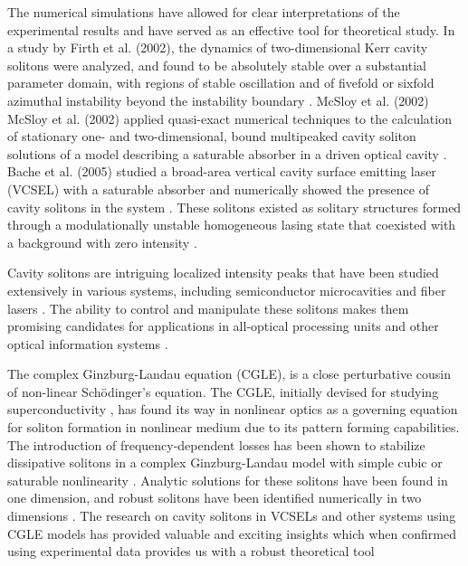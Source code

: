 The numerical simulations have allowed for clear interpretations of the experimental results and have served as an effective tool for theoretical study.
In a study by Firth et al. (2002), the dynamics of two-dimensional Kerr cavity solitons were analyzed, and found to be absolutely stable over a substantial 
parameter domain, with regions of stable oscillation and of fivefold or sixfold azimuthal instability beyond the instability boundary \cite{firthDynamicalPropertiesTwodimensional2002}.
McSloy et al. (2002) McSloy et al. (2002) applied quasi-exact numerical techniques to the calculation of stationary one- and two-dimensional, bound multipeaked cavity soliton solutions of a model describing a saturable absorber in a driven 
optical cavity \cite{mcsloyComputationallyDeterminedExistence2002}. Bache et al. (2005) studied a broad-area vertical cavity surface emitting laser (VCSEL) with a saturable absorber and numerically showed the presence of cavity solitons in 
the system \cite{bacheCavitySolitonLaser2005a}. These solitons existed as solitary structures formed through a modulationally unstable homogeneous lasing state that coexisted with a background with zero intensity \cite{bacheCavitySolitonLaser2005a}.

Cavity solitons are intriguing localized intensity peaks that have been studied extensively in various systems, including semiconductor microcavities and fiber lasers \cite{genevetCavitySolitonLaser2008,barbayCavitySolitonsVCSEL2011,songRecentProgressStudy2019}. The 
ability to control and manipulate these solitons makes them promising candidates for applications in all-optical processing units and other optical information systems \cite{aghdamiTwodimensionalDiscreteCavity2012,ackemannFundamentalsApplicationsSpatial,eslamiAllOpticalLogic2012,ghadiAllopticalComputingCircuits2021,mcmahonPhysicsOpticalComputing2023,randComputingSolitons2009}.

The complex Ginzburg-Landau equation (CGLE), is a close perturbative cousin of non-linear Schödinger's equation. The CGLE, initially devised for studying superconductivity \cite{aransonWorldComplexGinzburgLandau2002}, has found its way in nonlinear optics as a governing 
equation for soliton formation in nonlinear medium due to its pattern forming capabilities. The introduction of frequency-dependent losses has been shown to stabilize dissipative solitons in a complex Ginzburg-Landau model with simple cubic or saturable nonlinearity \cite{firthCavitySolitonProperties2009}. 
Analytic solutions for these solitons have been found in one dimension, and robust solitons have been identified numerically in two dimensions \cite{firthCavitySolitonProperties2009}. The research on cavity solitons in VCSELs and other systems using CGLE models has provided valuable and exciting insights which 
when confirmed using experimental data provides us with a robust theoretical tool \cite{hachairCavitySolitonsBroad2004,ackemannRealizationCavitysolitonLaser2007,paulauDriftingInstabilitiesCavity2009,firthCavitySolitonProperties2009}

